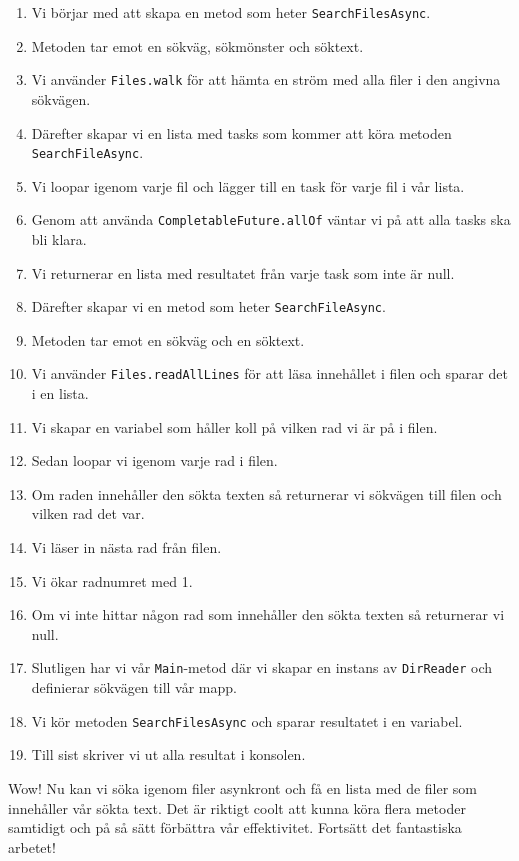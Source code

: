 \begin{enumerate}
\def\labelenumi{\arabic{enumi}.}
\tightlist
\item
  Vi börjar med att skapa en metod som heter \texttt{SearchFilesAsync}.
\item
  Metoden tar emot en sökväg, sökmönster och söktext.
\item
  Vi använder \texttt{Files.walk} för att hämta en ström med alla filer
  i den angivna sökvägen.
\item
  Därefter skapar vi en lista med tasks som kommer att köra metoden
  \texttt{SearchFileAsync}.
\item
  Vi loopar igenom varje fil och lägger till en task för varje fil i vår
  lista.
\item
  Genom att använda \texttt{CompletableFuture.allOf} väntar vi på att
  alla tasks ska bli klara.
\item
  Vi returnerar en lista med resultatet från varje task som inte är
  null.
\item
  Därefter skapar vi en metod som heter \texttt{SearchFileAsync}.
\item
  Metoden tar emot en sökväg och en söktext.
\item
  Vi använder \texttt{Files.readAllLines} för att läsa innehållet i
  filen och sparar det i en lista.
\item
  Vi skapar en variabel som håller koll på vilken rad vi är på i filen.
\item
  Sedan loopar vi igenom varje rad i filen.
\item
  Om raden innehåller den sökta texten så returnerar vi sökvägen till
  filen och vilken rad det var.
\item
  Vi läser in nästa rad från filen.
\item
  Vi ökar radnumret med 1.
\item
  Om vi inte hittar någon rad som innehåller den sökta texten så
  returnerar vi null.
\item
  Slutligen har vi vår \texttt{Main}-metod där vi skapar en instans av
  \texttt{DirReader} och definierar sökvägen till vår mapp.
\item
  Vi kör metoden \texttt{SearchFilesAsync} och sparar resultatet i en
  variabel.
\item
  Till sist skriver vi ut alla resultat i konsolen.
\end{enumerate}

Wow! Nu kan vi söka igenom filer asynkront och få en lista med de filer
som innehåller vår sökta text. Det är riktigt coolt att kunna köra flera
metoder samtidigt och på så sätt förbättra vår effektivitet. Fortsätt
det fantastiska arbetet!

